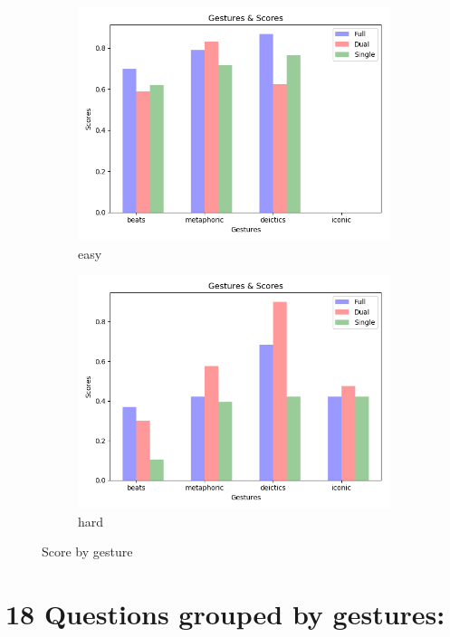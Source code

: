 \documentclass[11pt]{article}
\begin{document}
\begin{figure}[H]
    \centering
    \begin{subfigure}[t]{0.5\textwidth}
        \centering
        \includegraphics[scale=0.5]{easy}
        \caption{easy}
    \end{subfigure}%
    \begin{subfigure}[t]{0.5\textwidth}
        \centering
        \includegraphics[scale=0.5]{hard}
        \caption{hard}
    \end{subfigure}
    \caption{Score by gesture}
\end{figure}

\section{18 Questions grouped by gestures:}
\end{document}

